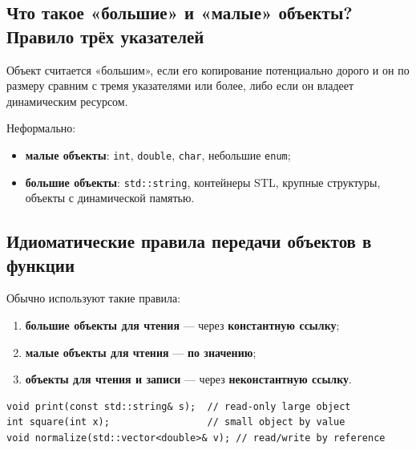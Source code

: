 \subsection{Что такое «большие» и «малые» объекты? Правило трёх указателей}
\begin{definition}
Объект считается «большим», если его копирование потенциально дорого и он по размеру сравним с тремя указателями или более, либо если он владеет динамическим ресурсом.
\end{definition}

Неформально:
\begin{itemize}
    \item \textbf{малые объекты}: \texttt{int}, \texttt{double}, \texttt{char}, небольшие \texttt{enum};
    \item \textbf{большие объекты}: \texttt{std::string}, контейнеры STL, крупные структуры, объекты с динамической памятью.
\end{itemize}

\subsection{Идиоматические правила передачи объектов в функции}
Обычно используют такие правила:
\begin{enumerate}
    \item \textbf{большие объекты для чтения} — через \textbf{константную ссылку};
    \item \textbf{малые объекты для чтения} — \textbf{по значению};
    \item \textbf{объекты для чтения и записи} — через \textbf{неконстантную ссылку}.
\end{enumerate}

\begin{example}
\begin{verbatim}
void print(const std::string& s);  // read-only large object
int square(int x);                 // small object by value
void normalize(std::vector<double>& v); // read/write by reference
\end{verbatim}
\end{example}

